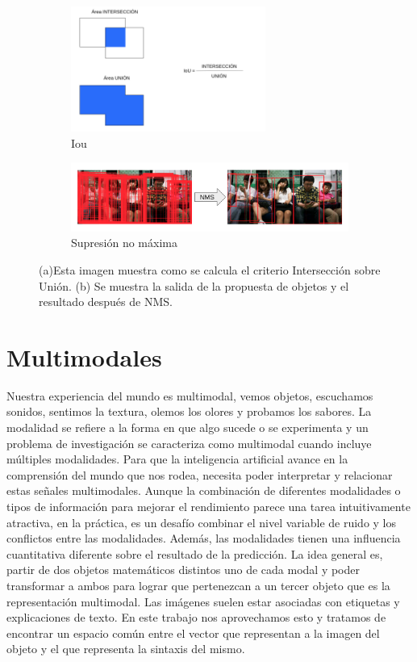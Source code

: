 \begin{figure}[H]
	\begin{subfigure}{.4\textwidth}
		\centering
		\includegraphics[width=0.7\textwidth]{img/iou.png}
		\caption{Iou}
		\label{fig:IoU}
	\end{subfigure}
	\begin{subfigure}{.6\textwidth}
		\centering
		\centering
		\includegraphics[width=1.1\textwidth]{img/NMS.png}
		\caption{Supresión no máxima}
		\label{fig:NMS}
	\end{subfigure}
	\caption{(a)Esta imagen muestra como se calcula el criterio Intersección sobre Unión. (b) Se muestra la salida de la propuesta de objetos y el resultado después de NMS.}
		\label{fig:RP}
\end{figure}

\section{Multimodales}

Nuestra experiencia del mundo es multimodal, vemos objetos, escuchamos sonidos, sentimos la textura, olemos los olores y probamos los sabores. La modalidad se refiere a la forma en que algo sucede o se experimenta y un problema de investigación se caracteriza como multimodal cuando incluye múltiples modalidades. Para que la inteligencia artificial avance en la comprensión del mundo que nos rodea, necesita poder interpretar y relacionar estas señales multimodales. Aunque la combinación de diferentes modalidades o tipos de información para mejorar el rendimiento parece una tarea intuitivamente atractiva, en la práctica, es un desafío combinar el nivel variable de ruido y los conflictos entre las modalidades. Además, las modalidades tienen una influencia cuantitativa diferente sobre el resultado de la predicción. La idea general es, partir de dos objetos matemáticos distintos uno de cada modal y poder transformar a ambos para lograr que pertenezcan a un tercer objeto que es la representación multimodal. Las imágenes suelen estar asociadas con etiquetas y explicaciones de texto. En este trabajo nos aprovechamos esto y tratamos de encontrar un espacio común entre el vector que representan a la imagen del objeto y el que representa la sintaxis del mismo.


